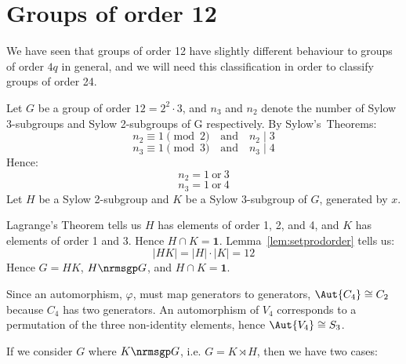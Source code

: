 \section{Groups of order 12}
We have seen that groups of order 12 have slightly different behaviour to groups of order \(4q\) in general, and we will
need this classification in order to classify groups of order 24.

Let \(G\) be a group of order \(12 = 2^2 \cdot 3\), and \(n_3\) and \(n_2\) denote the number of Sylow 3-subgroups and
Sylow 2-subgroups of G respectively.
By Sylow's~Theorems:
\[n_2 \equiv 1 \pmod{2} \quad \text{and} \quad n_2 \mid 3\]
\[n_3 \equiv 1 \pmod{3} \quad \text{and} \quad n_3 \mid 4\]
Hence:
\[n_2 = 1 \ \text{or} \ 3\]
\[n_3 = 1 \ \text{or} \ 4\]
Let \(H\) be a Sylow 2-subgroup and \(K\) be a Sylow 3-subgroup of \(G\), generated by \(x\).

Lagrange's Theorem tells us \(H\) has elements of order 1, 2, and 4, and \(K\) has elements of order 1 and 3.
Hence \(H \cap K = \bm{1}\).
Lemma~\ref{lem:setprodorder} tells us:
\[|HK| = |H| \cdot |K| = 12\]
Hence \(G = HK\), \(H \nrmsgp G\), and \(H \cap K = \bm{1}\).

Since an automorphism, \(\varphi\), must map generators to generators, \(\Aut{C_4} \cong C_2\) because \(C_4\) has two
generators.
An automorphism of \(V_4\) corresponds to a permutation of the three
non-identity elements, hence \(\Aut{V_4} \cong S_3\).

If we consider \(G\) where \(K \nrmsgp G\), i.e. \(G = K \rtimes H\), then we have two cases:

